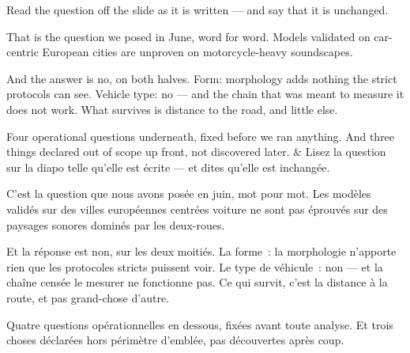 \documentclass[10pt,a4paper]{article}
\begin{document}
\begin{say}
Read the question off the slide as it is written --- and say that it is unchanged.

 That is the question we posed in June, word for
word. Models validated on car-centric European cities are unproven on
motorcycle-heavy soundscapes.


And the answer is no, on both halves. Form: morphology adds nothing the strict
protocols can see. Vehicle type: no --- and the chain that was meant to measure it
does not work. What survives is distance to the road, and little else.

Four operational questions underneath, fixed before we ran anything. And three
things declared out of scope up front, not discovered later.
&
Lisez la question sur la diapo telle qu'elle est écrite --- et dites qu'elle est
inchangée.

 C'est la question que nous avons posée en juin, mot
pour mot. Les modèles validés sur des villes européennes centrées voiture ne sont
pas éprouvés sur des paysages sonores dominés par les deux-roues.


Et la réponse est non, sur les deux moitiés. La forme~: la morphologie n'apporte
rien que les protocoles stricts puissent voir. Le type de véhicule~: non --- et la
chaîne censée le mesurer ne fonctionne pas. Ce qui survit, c'est la distance à la
route, et pas grand-chose d'autre.

Quatre questions opérationnelles en dessous, fixées avant toute analyse. Et trois
choses déclarées hors périmètre d'emblée, pas découvertes après coup.
\end{say}
\end{document}
